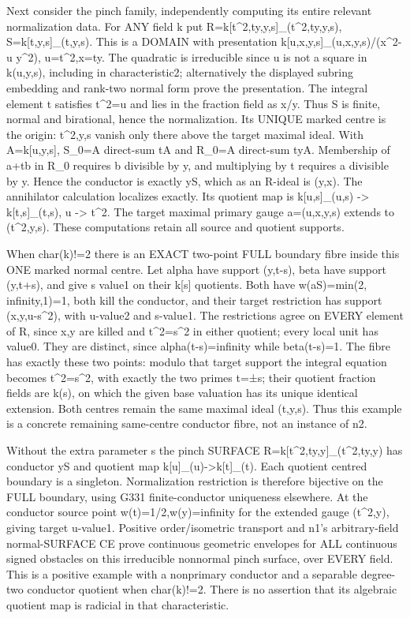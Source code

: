 \documentclass[11pt]{article}
\begin{document}
Next consider the pinch family, independently computing its entire relevant normalization data. For ANY field k put
R=k[t\textasciicircum{}2,ty,y,s]\_(t\textasciicircum{}2,ty,y,s), S=k[t,y,s]\_(t,y,s).
This is a DOMAIN with presentation k[u,x,y,s]\_(u,x,y,s)/(x\textasciicircum{}2-u y\textasciicircum{}2), u=t\textasciicircum{}2,x=ty. The quadratic is irreducible since u is not a square in k(u,y,s), including in characteristic2; alternatively the displayed subring embedding and rank-two normal form prove the presentation. The integral element t satisfies t\textasciicircum{}2=u and lies in the fraction field as x/y. Thus S is finite, normal and birational, hence the normalization. Its UNIQUE marked centre is the origin: t\textasciicircum{}2,y,s vanish only there above the target maximal ideal. With A=k[u,y,s], S\_0=A direct-sum tA and R\_0=A direct-sum tyA. Membership of a+tb in R\_0 requires b divisible by y, and multiplying by t requires a divisible by y. Hence the conductor is exactly yS, which as an R-ideal is (y,x). The annihilator calculation localizes exactly. Its quotient map is
k[u,s]\_(u,s) -\textgreater{} k[t,s]\_(t,s), u -\textgreater{} t\textasciicircum{}2.
The target maximal primary gauge a=(u,x,y,s) extends to (t\textasciicircum{}2,y,s). These computations retain all source and quotient supports.

When char(k)!=2 there is an EXACT two-point FULL boundary fibre inside this ONE marked normal centre. Let alpha have support (y,t-s), beta have support (y,t+s), and give s value1 on their k[s] quotients. Both have w(aS)=min(2, infinity,1)=1, both kill the conductor, and their target restriction has support (x,y,u-s\textasciicircum{}2), with u-value2 and s-value1. The restrictions agree on EVERY element of R, since x,y are killed and t\textasciicircum{}2=s\textasciicircum{}2 in either quotient; every local unit has value0. They are distinct, since alpha(t-s)=infinity while beta(t-s)=1. The fibre has exactly these two points: modulo that target support the integral equation becomes t\textasciicircum{}2=s\textasciicircum{}2, with exactly the two primes t=±s; their quotient fraction fields are k(s), on which the given base valuation has its unique identical extension. Both centres remain the same maximal ideal (t,y,s). Thus this example is a concrete remaining same-centre conductor fibre, not an instance of n2.

Without the extra parameter s the pinch SURFACE R=k[t\textasciicircum{}2,ty,y]\_(t\textasciicircum{}2,ty,y) has conductor yS and quotient map k[u]\_(u)-\textgreater{}k[t]\_(t). Each quotient centred boundary is a singleton. Normalization restriction is therefore bijective on the FULL boundary, using G331 finite-conductor uniqueness elsewhere. At the conductor source point w(t)=1/2,w(y)=infinity for the extended gauge (t\textasciicircum{}2,y), giving target u-value1. Positive order/isometric transport and n1's arbitrary-field normal-SURFACE CE prove continuous geometric envelopes for ALL continuous signed obstacles on this irreducible nonnormal pinch surface, over EVERY field. This is a positive example with a nonprimary conductor and a separable degree-two conductor quotient when char(k)!=2. There is no assertion that its algebraic quotient map is radicial in that characteristic.
\end{document}
